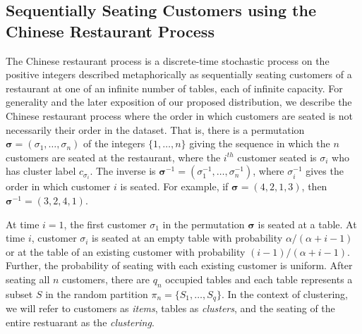 \documentclass[lineno]{biometrika-dbd}
\newcommand{\partition}{\ensuremath{\pi}}
\newcommand{\mass}{\alpha}
\begin{document}
\subsection{Sequentially Seating Customers using the Chinese Restaurant Process}
\label{sec_cr_sequential}

The Chinese restaurant process is a discrete-time stochastic process on the
positive integers described metaphorically as sequentially seating customers of
a restaurant at one of an infinite number of tables, each of infinite capacity.
For generality and the later exposition of our proposed distribution, we
describe the Chinese restaurant process where the order in which customers are
seated is not necessarily their order in the dataset.  That is, there is a
permutation $\bm{\sigma} = (\sigma_1,\ldots,\sigma_n)$ of the integers
$\{1,\ldots,n\}$ giving the sequence in which the $n$ customers are seated at
the restaurant, where the $i^{th}$ customer seated is $\sigma_i$ who has
cluster label $c_{\sigma_i}$.  The inverse is $\bm{\sigma}^{-1} =
(\sigma_1^{-1},\ldots,\sigma_n^{-1})$, where $\sigma_i^{-1}$ gives the order in
which customer $i$ is seated.  For example, if $\bm{\sigma} = (4,2,1,3)$, then
$\bm{\sigma}^{-1} = (3,2,4,1)$.

At time $i=1$, the first customer $\sigma_1$ in the permutation $\bm{\sigma}$
is seated at a table.  At time $i$, customer $\sigma_i$ is seated at an empty
table with probability $\mass / (\mass + i - 1)$ or at the table of an existing
customer with probability $(i-1) / (\mass + i -1 )$.  Further, the probability
of seating with each existing customer is uniform. After seating all $n$
customers, there are $q_n$ occupied tables and each table represents a subset
$S$ in the random partition $\partition_n = \{S_1,\ldots,S_q\}$.  In the
context of clustering, we will refer to customers as \emph{items}, tables as
\emph{clusters}, and the seating of the entire restuarant as the
\emph{clustering}.
\end{document}
